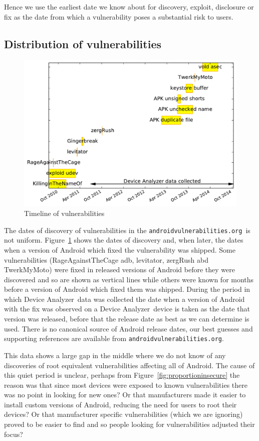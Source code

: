 \documentclass[conference,a4paper,twoside]{IEEEtran}
\newcommand{\da}{Device Analyzer}
\newcommand{\avo}{\texttt{androidvulnerabilities.org}}
\begin{document}
Hence we use the earliest date we know about for discovery, exploit, disclosure or fix as the date from which a vulnerability poses a substantial risk to users.


\subsection{Distribution of vulnerabilities}
\begin{figure}
 \centering
 \includegraphics[width=\columnwidth]{figures/vulnerabilities_timeline}
 \caption{Timeline of vulnerabilities}
 \label{fig:vulnerabilities_timeline}
\end{figure}

The dates of discovery of vulnerabilities in the \avo\ is not uniform.
Figure~\ref{fig:vulnerabilities_timeline} shows the dates of discovery and, when later, the dates when a version of Android which fixed the vulnerability was shipped.
Some vulnerabilities (RageAgainstTheCage adb, levitator, zergRush abd TwerkMyMoto) were fixed in released versions of Android before they were discovered and so are shown as vertical lines while others were known for months before a version of Android which fixed them was shipped.
During the period in which \da\ data was collected the date when a version of Android with the fix was observed on a \da\ device is taken as the date that version was released, before that the release date as best as we can determine is used.
There is no canonical source of Android release dates, our best guesses and supporting references are available from \avo.

This data shows a large gap in the middle where we do not know of any discoveries of root equivalent vulnerabilities affecting all of Android.
The cause of this quiet period is unclear, perhaps from Figure~\ref{fig:proportioninsecure} the reason was that since most devices were exposed to known vulnerabilities there was no point in looking for new ones?
Or that manufacturers made it easier to install custom versions of Android, reducing the need for users to root their devices?
Or that manufacturer specific vulnerabilities (which we are ignoring) proved to be easier to find and so people looking for vulnerabilities adjusted their focus?
\end{document}
